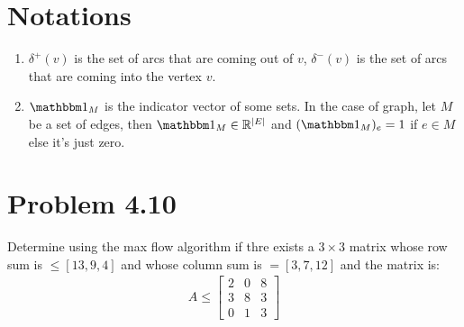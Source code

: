 \documentclass[]{article}
\theoremstyle{definition}
\begin{document}
\section{Notations}
\begin{enumerate}
    \item $\delta^+(v)$ is the set of arcs that are coming out of $v$, $\delta^-(v)$ is the set of arcs that are coming into the vertex $v$. 
    \item $\mathbbm 1_M$ is the indicator vector of some sets. In the case of graph, let $M$ be a set of edges, then $\mathbbm 1_M \in \mathbb R^{|E|}$ and $(\mathbbm 1_{M})_e = 1$ if $e \in M$ else it's just zero. 
\end{enumerate}
\section{Problem 4.10}
    Determine using the max flow algorithm if thre exists a $3\times 3$ matrix whose row sum is $\le [13, 9, 4]$ and whose column sum is $= [3, 7, 12]$ and the matrix is: 
    \begin{align}
        A \le \begin{bmatrix}
            2 & 0 & 8 \\
            3 & 8 & 3 \\
            0 & 1 & 3
        \end{bmatrix}
    \end{align}
\end{document}
